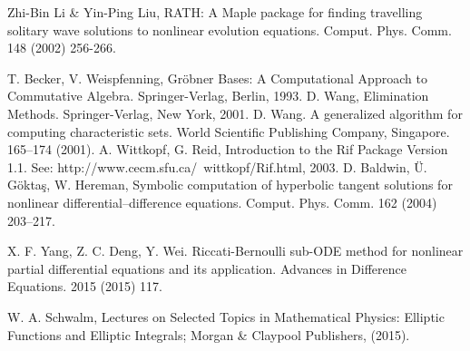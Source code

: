 \documentclass[prd,aps,floats,showkeys,nofootinbib,notitlepage]{revtex4-2}
\begin{document}
\begin{thebibliography}{00}
		 Zhi-Bin Li \& Yin-Ping Liu, RATH: A Maple package for finding travelling solitary wave solutions to nonlinear evolution equations. Comput. Phys. Comm. {148} (2002) 256-266.
		
		 T. Becker, V. Weispfenning, Gr\"obner Bases: A Computational Approach to Commutative Algebra. Springer-Verlag, Berlin, 1993.
		 D. Wang, Elimination Methods. Springer-Verlag, New York, 2001.
		 D. Wang. A generalized algorithm for computing characteristic sets. World Scientific Publishing Company, Singapore. 165–174 (2001). 
		 A. Wittkopf, G. Reid, Introduction to the Rif Package Version 1.1. See: http://www.cecm.sfu.ca/~wittkopf/Rif.html, 2003.
		 D. Baldwin, \"U. G\"okta\c{s}, W. Hereman, Symbolic computation of hyperbolic tangent solutions for nonlinear differential–difference equations. Comput. Phys. Comm. 162 (2004) 203–217.
		
		
		 X. F. Yang, Z. C. Deng, Y. Wei. Riccati-Bernoulli sub-ODE method for nonlinear partial differential equations and its application. Advances in Difference Equations. 2015 (2015) 117.
		 
		W. A. Schwalm, Lectures on Selected Topics in Mathematical Physics: Elliptic Functions and Elliptic Integrals; Morgan \& Claypool Publishers, (2015).

		
		
		
		
	
		
	\end{thebibliography}
	
\end{document}
